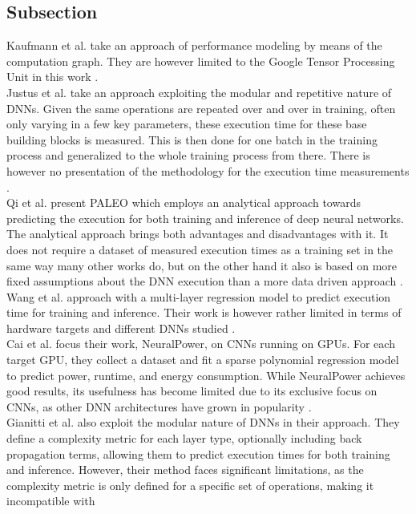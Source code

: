 \subsection{Subsection}
Kaufmann et al. take an approach of performance modeling by means of the computation graph. They are
however limited to the Google Tensor Processing Unit in this work \cite{kaufman_learned_2021}. \\
Justus et al. take an approach exploiting the modular and repetitive nature of DNNs. Given the same operations
are repeated over and over in training, often only varying in a few key parameters, these execution time for
these base building blocks is measured. This is then done for one batch in the training process and
generalized to the whole training process from there. There is however no presentation of the 
methodology for the execution time measurements \cite{justus_predicting_2018}. \\
Qi et al. present PALEO which employs an analytical approach towards predicting the execution for both
training and inference of deep neural networks. The analytical approach brings both advantages and disadvantages
with it. It does not require a dataset of measured execution times as a training set in the same way many 
other works do, but on the other hand it also is based on more fixed assumptions about the DNN execution 
than a more data driven approach \cite{qi_paleo_2017}. \\
Wang et al. approach with a multi-layer regression model to predict execution time for training and inference.
Their work is however rather limited in terms of hardware targets and different DNNs studied \cite{wang_perfnet_2020}. \\
Cai et al. focus their work, NeuralPower, on CNNs running on GPUs. For each target GPU, they collect
a dataset and fit a sparse polynomial regression model to predict power, runtime, and energy consumption.
While NeuralPower achieves good results, its usefulness has become limited due to its exclusive focus on 
CNNs, as other DNN architectures have grown in popularity \cite{cai_neuralpower_nodate}. \\
Gianitti et al. also exploit the modular nature of DNNs in their approach. They define a complexity
metric for each layer type, optionally including back propagation terms, allowing them to predict
execution times for both training and inference. However, their method faces significant limitations,
as the complexity metric is only defined for a specific set of operations, making it incompatible with
